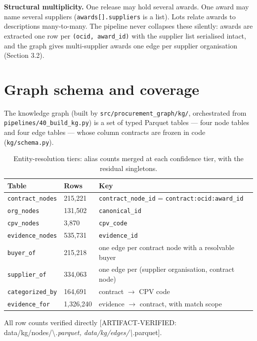 \textbf{Structural multiplicity.} One release may hold several awards. One award may name several suppliers (\texttt{awards[].suppliers} is a list). Lots relate awards to descriptions many-to-many. The pipeline never collapses these silently: awards are extracted one row per \texttt{(ocid, award\_id)} with the supplier list serialised intact, and the graph gives multi-supplier awards one edge per supplier organisation (Section 3.2).

\section{Graph schema and coverage}\label{sec:graph-schema-and-coverage}

The knowledge graph (built by \texttt{src/procurement\_graph/kg/}, orchestrated from \texttt{pipelines/40\_build\_kg.py}) is a set of typed Parquet tables --- four node tables and four edge tables --- whose column contracts are frozen in code (\texttt{kg/schema.py}).

\begin{table}[t]
\centering
\small
\caption{Entity-resolution tiers: alias counts merged at each confidence tier, with the residual singletons.}
\label{tab:03_data_kg_1}
\begin{tabular}{lll}
\toprule
Table & Rows & Key \\
\midrule
\texttt{contract\_nodes} & 215,221 & \texttt{contract\_node\_id} = \texttt{contract:{ocid}:{award\_id}} \\
\texttt{org\_nodes} & 131,502 & \texttt{canonical\_id} \\
\texttt{cpv\_nodes} & 3,870 & \texttt{cpv\_code} \\
\texttt{evidence\_nodes} & 535,731 & \texttt{evidence\_id} \\
\texttt{buyer\_of} & 215,218 & one edge per contract node with a resolvable buyer \\
\texttt{supplier\_of} & 334,063 & one edge per (supplier organisation, contract node) \\
\texttt{categorized\_by} & 164,691 & contract $\rightarrow$ CPV code \\
\texttt{evidence\_for} & 1,326,240 & evidence $\rightarrow$ contract, with match scope \\
\bottomrule
\end{tabular}
\end{table}


All row counts verified directly [ARTIFACT-VERIFIED: data/kg/nodes/\textbackslash{}\emph{.parquet, data/kg/edges/\textbackslash{}}.parquet].

